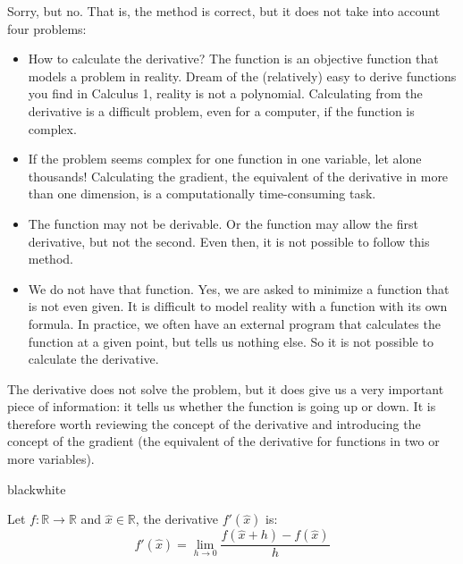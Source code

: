 Sorry, but no. That is, the method is correct, but it does not take into account four problems:
\begin{itemize}
    \item How to calculate the derivative? The function is an objective function that models a problem in reality. Dream of the (relatively) easy to derive functions you find in Calculus 1, reality is not a polynomial. Calculating from the derivative is a difficult problem, even for a computer, if the function is complex. 
    
    \item If the problem seems complex for one function in one variable, let alone thousands! Calculating the gradient, the equivalent of the derivative in more than one dimension, is a computationally time-consuming task.
    
    \item The function may not be derivable. Or the function may allow the first derivative, but not the second. Even then, it is not possible to follow this method.
    
    \item We do not have that function. Yes, we are asked to minimize a function that is not even given. 
    It is difficult to model reality with a function with its own formula. In practice, we often have an external program that calculates the function at a given point, but tells us nothing else. So it is not possible to calculate the derivative.
\end{itemize}

The derivative does not solve the problem, but it does give us a very important piece of information: it tells us whether the function is going up or down. It is therefore worth reviewing the concept of the derivative and introducing the concept of the gradient (the equivalent of the derivative for functions in two or more variables). 


\begin{remark}{black}{white}
    \begin{definition}[Derivative]
        Let \( f : \mathbb{R} \rightarrow \mathbb{R} \) and \( \widehat{x} \in \mathbb{R} \), the derivative \( f'(\widehat{x}) \) is:
        \[
            f'(\widehat{x}) = \lim_{h \rightarrow 0} \frac{f(\widehat{x} + h) - f(\widehat{x})}{h}
        \]
    \end{definition}
\end{remark}

